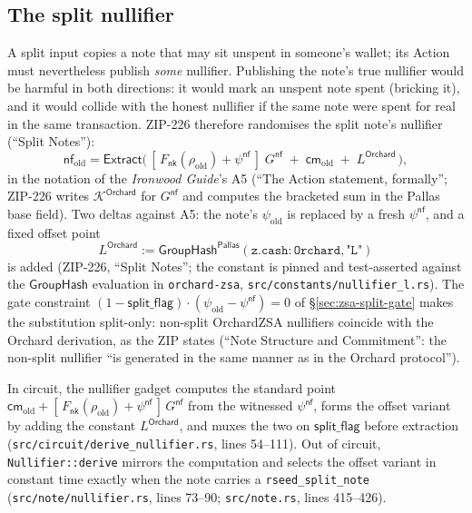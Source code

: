 \documentclass[11pt,a4paper]{article}
\theoremstyle{definition}
\newcommand{\nfsym}{\mathsf{nf}}
\newcommand{\cmsym}{\mathsf{cm}}
\newcommand{\Pallas}{\ensuremath{\mathsf{Pallas}}}
\newcommand{\Extract}{\ensuremath{\mathsf{Extract}}}
\newcommand{\GroupHash}{\ensuremath{\mathsf{GroupHash}}}
\newcommand{\nksym}{\ensuremath{\mathsf{nk}}}
\begin{document}
\subsection{The split nullifier}\label{sec:zsa-split-nf}

A split input copies a note that may sit unspent in someone's wallet; its
Action must nevertheless publish \emph{some} nullifier. Publishing the
note's true nullifier would be harmful in both directions: it would mark
an unspent note spent (bricking it), and it would collide with the honest
nullifier if the same note were spent for real in the same transaction.
ZIP-226 therefore randomises the split note's nullifier (``Split
Notes''):
\begin{equation}\label{eq:zsa-split-nf}
\nfsym_{\mathrm{old}} = \Extract\bigl(\,[\,F_{\nksym}(\rho_{\mathrm{old}})
+ \psi^{\nfsym}\,]\; G^{\mathsf{nf}} \;+\; \cmsym_{\mathrm{old}} \;+\;
L^{\mathsf{Orchard}}\,\bigr),
\end{equation}
in the notation of the \emph{Ironwood Guide}'s A5 (``The Action statement,
formally''; ZIP-226 writes $\mathcal{K}^{\mathsf{Orchard}}$ for
$G^{\mathsf{nf}}$ and computes the bracketed sum in the Pallas base
field). Two deltas against A5: the note's $\psi_{\mathrm{old}}$ is
replaced by a fresh $\psi^{\nfsym}$, and a fixed offset point
\[
L^{\mathsf{Orchard}} :=
\GroupHash^{\Pallas}(\mathtt{z.cash:Orchard}, \texttt{"L"})
\]
is added (ZIP-226, ``Split Notes''; the constant is pinned and
test-asserted against the $\GroupHash$ evaluation in
\texttt{orchard-zsa}, \texttt{src/constants/nullifier\_l.rs}). The gate
constraint $(1 - \mathsf{split\_flag}) \cdot (\psi_{\mathrm{old}} -
\psi^{\nfsym}) = 0$ of \S\ref{sec:zsa-split-gate} makes the substitution
split-only: non-split OrchardZSA nullifiers coincide with the Orchard
derivation, as the ZIP states (``Note Structure and Commitment'': the
non-split nullifier ``is generated in the same manner as in the Orchard
protocol'').

In circuit, the nullifier gadget computes the standard point
$\cmsym_{\mathrm{old}} + [\,F_{\nksym}(\rho_{\mathrm{old}}) +
\psi^{\nfsym}\,]\,G^{\mathsf{nf}}$ from the witnessed $\psi^{\nfsym}$,
forms the offset variant by adding the constant $L^{\mathsf{Orchard}}$,
and muxes the two on $\mathsf{split\_flag}$ before extraction
(\texttt{src/circuit/derive\_nullifier.rs}, lines 54--111). Out of
circuit, \texttt{Nullifier::derive} mirrors the computation and selects
the offset variant in constant time exactly when the note carries a
\texttt{rseed\_split\_note} (\texttt{src/note/nullifier.rs}, lines
73--90; \texttt{src/note.rs}, lines 415--426).
\end{document}
